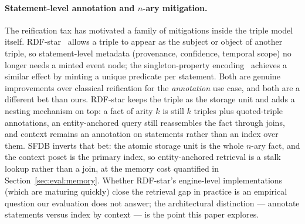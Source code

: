 \paragraph{Statement-level annotation and $n$-ary mitigation.}
The reification tax has motivated a family of mitigations inside the
triple model itself. RDF-star~\cite{hartig2017rdfstar,w3c2021rdfstar}
allows a triple to appear as the subject or object of another triple, so
statement-level metadata (provenance, confidence, temporal scope) no
longer needs a minted event node; the singleton-property
encoding~\cite{nguyen2014singleton} achieves a similar effect by minting
a unique predicate per statement. Both are genuine improvements over
classical reification for the \emph{annotation} use case, and both are
a different bet than ours. RDF-star keeps the triple as the storage
unit and adds a nesting mechanism on top: a fact of arity $k$ is still
$k$ triples plus quoted-triple annotations, an entity-anchored query
still reassembles the fact through joins, and context remains an
annotation on statements rather than an index over them. SFDB inverts
that bet: the atomic storage unit is the whole $n$-ary fact, and the
context poset is the primary index, so entity-anchored retrieval is a
stalk lookup rather than a join, at the memory cost quantified in
Section~\ref{sec:eval:memory}. Whether RDF-star's engine-level
implementations (which are maturing quickly) close the retrieval gap in
practice is an empirical question our evaluation does not answer; the
architectural distinction --- annotate statements versus index by
context --- is the point this paper explores.


